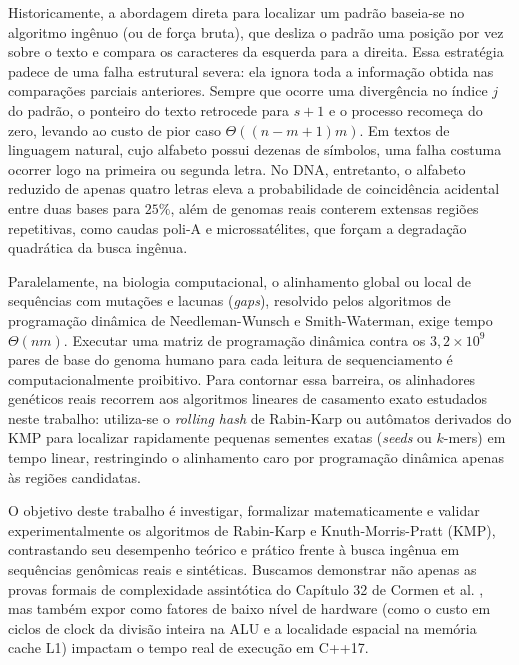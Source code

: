 \documentclass[12pt,a4paper]{article}
\begin{document}
Historicamente, a abordagem direta para localizar um padr\~ao baseia-se no algoritmo ing\^enuo (ou de for\c{c}a bruta), que desliza o padr\~ao uma posi\c{c}\~ao por vez sobre o texto e compara os caracteres da esquerda para a direita. Essa estrat\'egia padece de uma falha estrutural severa: ela ignora toda a informa\c{c}\~ao obtida nas compara\c{c}\~oes parciais anteriores. Sempre que ocorre uma diverg\^encia no \'indice $j$ do padr\~ao, o ponteiro do texto retrocede para $s+1$ e o processo recome\c{c}a do zero, levando ao custo de pior caso $\Theta((n-m+1)m)$. Em textos de linguagem natural, cujo alfabeto possui dezenas de s\'imbolos, uma falha costuma ocorrer logo na primeira ou segunda letra. No DNA, entretanto, o alfabeto reduzido de apenas quatro letras eleva a probabilidade de coincid\^encia acidental entre duas bases para $25\%$, al\'em de genomas reais conterem extensas regi\~oes repetitivas, como caudas poli-A e microssat\'elites, que for\c{c}am a degrada\c{c}\~ao quadr\'atica da busca ing\^enua.

Paralelamente, na biologia computacional, o alinhamento global ou local de sequ\^encias com muta\c{c}\~oes e lacunas (\textit{gaps}), resolvido pelos algoritmos de programa\c{c}\~ao din\^amica de Needleman-Wunsch e Smith-Waterman, exige tempo $\Theta(nm)$. Executar uma matriz de programa\c{c}\~ao din\^amica contra os $3,2 \times 10^9$ pares de base do genoma humano para cada leitura de sequenciamento \'e computacionalmente proibitivo. Para contornar essa barreira, os alinhadores gen\'eticos reais recorrem aos algoritmos lineares de casamento exato estudados neste trabalho: utiliza-se o \textit{rolling hash} de Rabin-Karp ou aut\^omatos derivados do KMP para localizar rapidamente pequenas sementes exatas (\textit{seeds} ou $k$-mers) em tempo linear, restringindo o alinhamento caro por programa\c{c}\~ao din\^amica apenas \`as regi\~oes candidatas.

O objetivo deste trabalho \'e investigar, formalizar matematicamente e validar experimentalmente os algoritmos de Rabin-Karp e Knuth-Morris-Pratt (KMP), contrastando seu desempenho te\'orico e pr\'atico frente \`a busca ing\^enua em sequ\^encias gen\^omicas reais e sint\'eticas. Buscamos demonstrar n\~ao apenas as provas formais de complexidade assint\'otica do Cap\'itulo 32 de Cormen et al. \cite{cormen2022}, mas tamb\'em expor como fatores de baixo n\'ivel de hardware (como o custo em ciclos de clock da divis\~ao inteira na ALU e a localidade espacial na mem\'oria cache L1) impactam o tempo real de execu\c{c}\~ao em C++17.
\end{document}
